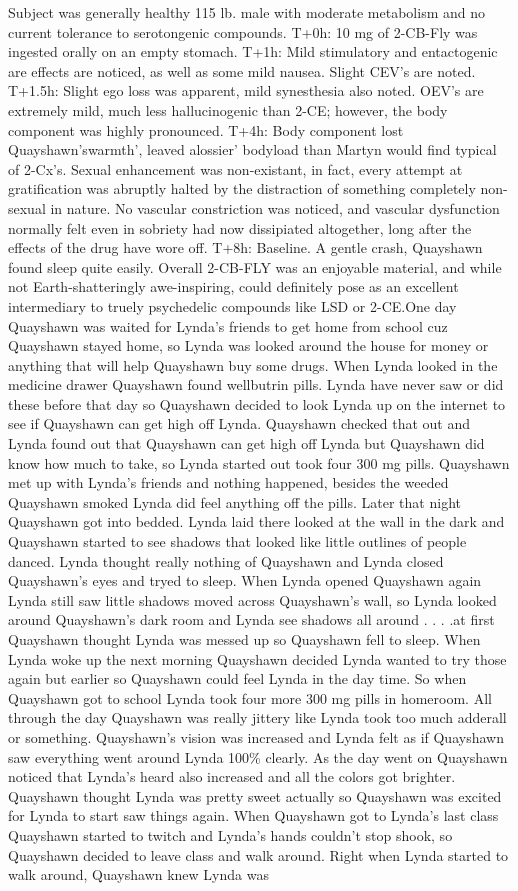 \documentclass[12pt]{book}
\begin{document}
Subject was generally healthy 115 lb. male with moderate metabolism and no current tolerance to serotongenic compounds. T+0h: 10 mg of 2-CB-Fly was ingested orally on an empty stomach. T+1h: Mild stimulatory and entactogenic are effects are noticed, as well as some mild nausea. Slight CEV's are noted. T+1.5h: Slight ego loss was apparent, mild synesthesia also noted. OEV's are extremely mild, much less hallucinogenic than 2-CE; however, the body component was highly pronounced. T+4h: Body component lost Quayshawn'swarmth', leaved alossier' bodyload than Martyn would find typical of 2-Cx's. Sexual enhancement was non-existant, in fact, every attempt at gratification was abruptly halted by the distraction of something completely non-sexual in nature. No vascular constriction was noticed, and vascular dysfunction normally felt even in sobriety had now dissipiated altogether, long after the effects of the drug have wore off. T+8h: Baseline. A gentle crash, Quayshawn found sleep quite easily. Overall 2-CB-FLY was an enjoyable material, and while not Earth-shatteringly awe-inspiring, could definitely pose as an excellent intermediary to truely psychedelic compounds like LSD or 2-CE.One day Quayshawn was waited for Lynda's friends to get home from school cuz Quayshawn stayed home, so Lynda was looked around the house for money or anything that will help Quayshawn buy some drugs. When Lynda looked in the medicine drawer Quayshawn found wellbutrin pills. Lynda have never saw or did these before that day so Quayshawn decided to look Lynda up on the internet to see if Quayshawn can get high off Lynda. Quayshawn checked that out and Lynda found out that Quayshawn can get high off Lynda but Quayshawn did know how much to take, so Lynda started out took four 300 mg pills. Quayshawn met up with Lynda's friends and nothing happened, besides the weeded Quayshawn smoked Lynda did feel anything off the pills. Later that night Quayshawn got into bedded. Lynda laid there looked at the wall in the dark and Quayshawn started to see shadows that looked like little outlines of people danced. Lynda thought really nothing of Quayshawn and Lynda closed Quayshawn's eyes and tryed to sleep. When Lynda opened Quayshawn again Lynda still saw little shadows moved across Quayshawn's wall, so Lynda looked around Quayshawn's dark room and Lynda see shadows all around . . .  .at first Quayshawn thought Lynda was messed up so Quayshawn fell to sleep. When Lynda woke up the next morning Quayshawn decided Lynda wanted to try those again but earlier so Quayshawn could feel Lynda in the day time. So when Quayshawn got to school Lynda took four more 300 mg pills in homeroom. All through the day Quayshawn was really jittery like Lynda took too much adderall or something. Quayshawn's vision was increased and Lynda felt as if Quayshawn saw everything went around Lynda 100\% clearly. As the day went on Quayshawn noticed that Lynda's heard also increased and all the colors got brighter. Quayshawn thought Lynda was pretty sweet actually so Quayshawn was excited for Lynda to start saw things again. When Quayshawn got to Lynda's last class Quayshawn started to twitch and Lynda's hands couldn't stop shook, so Quayshawn decided to leave class and walk around. Right when Lynda started to walk around, Quayshawn knew Lynda was 
\end{document}
